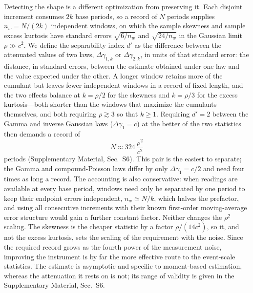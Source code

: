 \documentclass[preprint,12pt]{elsarticle}
\begin{document}
Detecting the shape is a different optimization from preserving it.
Each disjoint increment consumes $2k$ base periods, so a record of $N$
periods supplies $n_w=N/(2k)$ independent windows, on which the sample
skewness and sample excess kurtosis have standard errors $\sqrt{6/n_w}$ and
$\sqrt{24/n_w}$ in the Gaussian limit $\rho\gg c^2$. We define the
separability index $d'$ as the difference between the attenuated values of
two laws, $\Delta\gamma_{1,k}$ or $\Delta\gamma_{2,k}$, in units of that
standard error: the distance, in standard errors, between the estimate
obtained under one law and the value expected under the other. A longer
window retains more of the cumulant but leaves fewer independent windows in a
record of fixed length, and the two effects balance at $k=\rho/2$ for the
skewness and $k=\rho/3$ for the excess kurtosis---both shorter than the windows
that maximize the cumulants themselves, and both requiring $\rho\gtrsim3$
so that $k\ge1$. Requiring $d'=2$
between the Gamma and inverse Gaussian laws ($\Delta\gamma_1=c$) at the
better of the two statistics then demands a record of
\begin{equation}
  N\approx 324\,\frac{\rho^{2}}{c^{2}}
  \label{eq:Nreq}
\end{equation}
periods (Supplementary Material, Sec.~S6). This pair is the
easiest to separate; the Gamma and compound-Poisson laws differ by only
$\Delta\gamma_1=c/2$ and need four times as long a record. The accounting is
also conservative: when readings are available at every base period,
windows need only be separated by one period to keep their endpoint errors
independent, $n_w\simeq N/k$, which halves the prefactor, and using all
consecutive increments with their known first-order moving-average error
structure would gain a further constant factor. Neither changes the
$\rho^{2}$ scaling. The skewness is the cheaper
statistic by a factor $\rho/(14c^{2})$, so it, and not the excess kurtosis,
sets the scaling of the requirement with the noise. Since the required record grows as the
fourth power of the measurement noise,
improving the instrument is by far the more effective route to the event-scale
statistics.
The estimate is asymptotic and specific to moment-based estimation,
whereas the attenuation it rests on is not; its range of validity is given in
the Supplementary Material, Sec.~S6.
\end{document}
